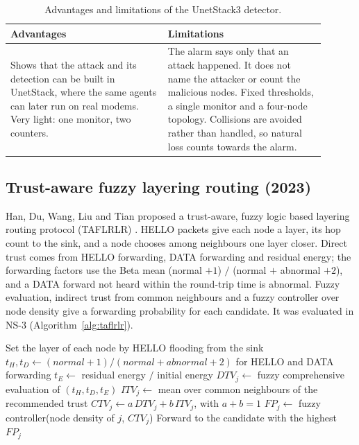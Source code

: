 \documentclass{article}
\begin{document}
\begin{table}[htbp]
\centering\footnotesize\renewcommand{\arraystretch}{1.1}
\begin{tabular}{|p{0.45\linewidth}|p{0.45\linewidth}|}
\hline
\textbf{Advantages} & \textbf{Limitations} \\
\hline
Shows that the attack and its detection can be built in UnetStack, where the same agents can later run on real modems. Very light: one monitor, two counters. & The alarm says only that an attack happened. It does not name the attacker or count the malicious nodes. Fixed thresholds, a single monitor and a four-node topology. Collisions are avoided rather than handled, so natural loss counts towards the alarm. \\
\hline
\end{tabular}
\caption{Advantages and limitations of the UnetStack3 detector.}
\end{table}

\subsection{Trust-aware fuzzy layering routing (2023)}\label{sec:taflrlr}
\noindent
Han, Du, Wang, Liu and Tian proposed a trust-aware, fuzzy logic based layering routing protocol (TAFLRLR) \cite{han2023}. HELLO packets give each node a layer, its hop count to the sink, and a node chooses among neighbours one layer closer. Direct trust comes from HELLO forwarding, DATA forwarding and residual energy; the forwarding factors use the Beta mean (normal $+1$) $/$ (normal $+$ abnormal $+2$), and a DATA forward not heard within the round-trip time is abnormal. Fuzzy evaluation, indirect trust from common neighbours and a fuzzy controller over node density give a forwarding probability for each candidate. It was evaluated in NS-3 (Algorithm~\ref{alg:taflrlr}).

\begin{algorithm}[htbp]
\small
\caption{Next-hop choice in TAFLRLR}\label{alg:taflrlr}
\begin{algorithmic}[1]
\State Set the layer of each node by HELLO flooding from the sink
  \State $t_H, t_D \gets (\mathit{normal}+1)/(\mathit{normal}+\mathit{abnormal}+2)$ for HELLO and DATA forwarding
  \State $t_E \gets$ residual energy $/$ initial energy
  \State $\mathit{DTV}_j \gets$ fuzzy comprehensive evaluation of $(t_H, t_D, t_E)$
  \State $\mathit{ITV}_j \gets$ mean over common neighbours of the recommended trust
  \State $\mathit{CTV}_j \gets a\,\mathit{DTV}_j + b\,\mathit{ITV}_j$, with $a+b=1$
  \State $\mathit{FP}_j \gets$ fuzzy controller(node density of $j$, $\mathit{CTV}_j$)
\EndFor
\State Forward to the candidate with the highest $\mathit{FP}_j$
\end{algorithmic}
\end{algorithm}
\end{document}
